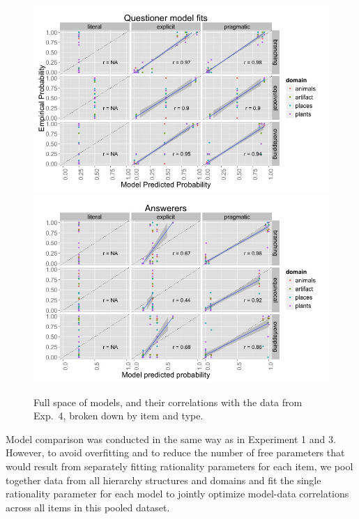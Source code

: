 \documentclass[12pt, floatsintext, jou]{apa6}
\begin{document}
%
\begin{figure}[t!]
\begin{center}
\includegraphics[scale=.55]{Exp4QuestFits.jpeg}
\includegraphics[scale=.55]{Exp4AnsFits.jpeg}
\end{center}
\vspace{-.5cm}
\caption{Full space of models, and their correlations with the data from Exp.~4, broken down by item and type.}
\label{fig:Exp4ModelSpace}
\vspace{-.15cm}
\end{figure}
%

Model comparison was conducted in the same way as in Experiment 1 and 3. However, to avoid overfitting and to reduce the number of free parameters that would result from separately fitting rationality parameters for each item, we pool together data from all hierarchy structures and domains and fit the single rationality parameter for each model to jointly optimize model-data correlations across all items in this pooled dataset. 
\end{document}
